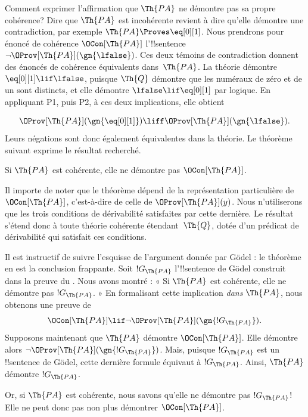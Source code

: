 \documentclass[../../../include/open-logic-section]{subfiles}
\begin{document}


Comment exprimer l'affirmation que $\Th{PA}$ ne
démontre pas sa propre cohérence? Dire que $\Th{PA}$
est incohérente revient à dire qu'elle démontre
une contradiction, par exemple
$\Th{PA}\Proves\eq[0][1]$. Nous prendrons pour
énoncé de cohérence $\OCon[\Th{PA}]$ l'!!{sentence}
$\lnot\OProv[\Th{PA}](\gn{\lfalse})$.
Ces deux témoins de contradiction donnent des énoncés de
cohérence équivalents dans~$\Th{PA}$. La théorie démontre
$\eq[0][1]\lif\lfalse$, puisque $\Th{Q}$ démontre que les
numéraux de zéro et de un sont distincts, et elle démontre
$\lfalse\lif\eq[0][1]$ par logique. En appliquant P1,
puis P2, à ces deux implications, elle obtient

\[
\OProv[\Th{PA}](\gn{\eq[0][1]})
\liff\OProv[\Th{PA}](\gn{\lfalse}).
\]
Leurs négations sont donc également équivalentes dans la
théorie. Le théorème suivant exprime le résultat recherché.

\begin{thm}
Si $\Th{PA}$ est cohérente, elle ne démontre pas
$\OCon[\Th{PA}]$.
\end{thm}

Il importe de noter que le théorème dépend de la
représentation particulière de
$\OCon[\Th{PA}]$, c'est-à-dire de celle de
$\OProv[\Th{PA}](y)$. Nous n'utiliserons que les
trois conditions de dérivabilité satisfaites par
cette dernière. Le résultat s'étend donc à toute
théorie cohérente étendant~$\Th{Q}$, dotée d'un prédicat de dérivabilité qui
satisfait ces conditions.

Il est instructif de suivre l'esquisse de
l'argument donnée par Gödel : le théorème en est
la conclusion frappante. Soit $!G_\Th{PA}$
l'!!{sentence} de Gödel construit dans la preuve du
. Nous avons
montré : « Si $\Th{PA}$ est cohérente, elle ne
démontre pas $!G_\Th{PA}$. » En formalisant cette
implication \emph{dans} $\Th{PA}$, nous obtenons
une preuve de
\[
\OCon[\Th{PA}] \lif
\lnot\OProv[\Th{PA}](\gn{!G_\Th{PA}}).
\]
Supposons maintenant que $\Th{PA}$ démontre
$\OCon[\Th{PA}]$. Elle démontre alors
$\lnot\OProv[\Th{PA}](\gn{!G_\Th{PA}})$.
Mais, puisque $!G_\Th{PA}$ est un !!{sentence}
de Gödel, cette dernière formule équivaut à
$!G_\Th{PA}$. Ainsi, $\Th{PA}$ démontre
$!G_\Th{PA}$.

Or, si $\Th{PA}$ est cohérente, nous savons
qu'elle ne démontre pas $!G_\Th{PA}$!{} Elle ne
peut donc pas non plus démontrer
$\OCon[\Th{PA}]$.
\end{document}
